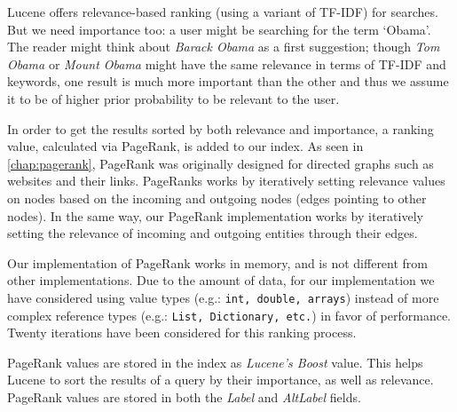 Lucene offers relevance-based ranking (using a variant of TF-IDF) for searches. But we need importance too: a user might be searching for the term `Obama'. The reader might think about \textit{Barack Obama} as a first suggestion; though \textit{Tom Obama} or \textit{Mount Obama} might have the same relevance in terms of TF-IDF and keywords, one result is much more important than the other and thus we assume it to be of higher prior probability to be relevant to the user.

In order to get the results sorted by both relevance and importance, a ranking value, calculated via PageRank, is added to our index. 
As seen in \autoref{chap:pagerank}, PageRank was originally designed for directed graphs such as websites and their links. 
PageRanks works by iteratively setting relevance values on nodes based on the incoming and outgoing nodes (edges pointing to other nodes). 
In the same way, our PageRank implementation works by iteratively setting the relevance of incoming and outgoing entities through their edges. 

Our implementation of PageRank works in memory, and is not different from other implementations. 
Due to the amount of data, for our implementation we have considered using value types (e.g.: \texttt{int, double, arrays}) instead of more complex reference types (e.g.: \texttt{List, Dictionary, etc.}) in favor of performance. 
Twenty iterations have been considered for this ranking process.

PageRank values are stored in the index as \textit{Lucene's Boost} value. This helps Lucene to sort the results of a query by their importance, as well as relevance. PageRank values are stored in both the \textit{Label} and \textit{AltLabel} fields.

